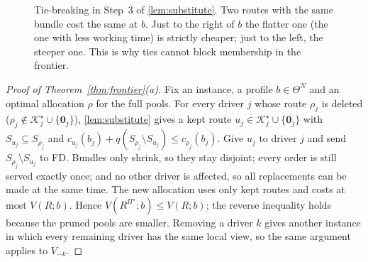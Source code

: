 \documentclass[11pt]{article}
\theoremstyle{definition}
\theoremstyle{remark}
\newcommand{\Ks}{\mathcal{K}^{\star}}
\newcommand{\idle}{\mathbf{0}}
\begin{document}
\begin{figure}[!htbp]
\centering
{}
\caption{Tie-breaking in Step~3 of \cref{lem:substitute}. Two routes with the
same bundle cost the same at $b$. Just to the right of $b$ the flatter one (the
one with less working time) is strictly cheaper; just to the left, the steeper
one. This is why ties cannot block membership in the frontier.}
\label{fig:tiebreak}
\end{figure}

\begin{proof}[Proof of Theorem~\ref{thm:frontier}(a)]
Fix an instance, a profile $b\in\Theta^N$ and an optimal allocation $\rho$ for
the full pools. For every driver $j$ whose route $\rho_j$ is deleted
($\rho_j\notin\Ks_j\cup\{\idle_j\}$), \cref{lem:substitute} gives a kept route
$u_j\in\Ks_j\cup\{\idle_j\}$ with $S_{u_j}\subseteq S_{\rho_j}$ and
$c_{u_j}(b_j)+q(S_{\rho_j}\setminus S_{u_j})\le c_{\rho_j}(b_j)$. Give $u_j$ to
driver $j$ and send $S_{\rho_j}\setminus S_{u_j}$ to FD. Bundles only shrink, so
they stay disjoint; every order is still served exactly once; and no other
driver is affected, so all replacements can be made at the same time. The new
allocation uses only kept routes and costs at most $V(R;b)$. Hence
$V(R^{\Pi^\star};b)\le V(R;b)$; the reverse inequality holds because the pruned
pools are smaller. Removing a driver $k$ gives another instance in which every
remaining driver has the same local view, so the same argument applies to
$V_{-k}$.
\end{proof}
\end{document}
